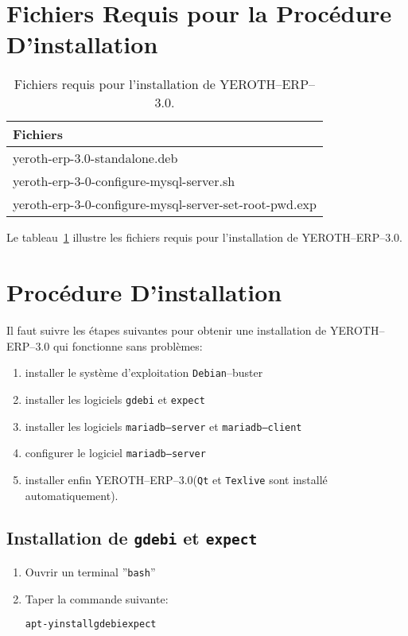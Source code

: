 \documentclass[a4paper, 10pt]{article}
\newcommand{\texlive}{\texttt{Texlive}\xspace}
\newcommand{\gdebi}{\texttt{gdebi}\xspace}
\newcommand{\expect}{\texttt{expect}\xspace}
\newcommand{\debian}{\texttt{Debian}\xspace}
\newcommand{\bash}{\texttt{bash}\xspace}
\newcommand{\qt}{\texttt{Qt}\xspace}
\newcommand{\mariadbserver}{\texttt{mariadb--server}\xspace}
\newcommand{\mariadbclient}{\texttt{mariadb--client}\xspace}
\newcommand{\yerotherptroiszero}{\textcolor{yerenColorBlue}{\sc YEROTH--ERP--$3.0$}\xspace}
\newcommand{\yerotherp}{\textcolor{yerenColorBlue}{\sc YEROTH--ERP--$3.0$}\xspace}
\newcommand{\rootcommand}[1]{
\begin{center}
\textcolor{purplish}{#1\xspace}
\end{center}}
\begin{document}
\section{Fichiers Requis pour la Proc\'edure D'installation}

\begin{table}[!htbp]
\centering
\begin{tabular}{|l|} \hline
\textbf{Fichiers}		\\ \hline
yeroth-erp-3.0-standalone.deb							\\ \hline
yeroth-erp-3-0-configure-mysql-server.sh				\\ \hline	
yeroth-erp-3-0-configure-mysql-server-set-root-pwd.exp	\\ \hline	
\end{tabular}
\caption{Fichiers requis pour l'installation de \yerotherptroiszero.}
\label{tab:required-files}
\end{table}

Le tableau~\ref{tab:required-files} illustre les fichiers
requis pour l'installation de \yerotherp.

\section{Proc\'edure D'installation}

Il faut suivre les \'etapes suivantes pour obtenir
une installation de \yerotherptroiszero qui fonctionne
sans probl\`emes:

\begin{enumerate} [1)]
	\item installer le syst\`eme d'exploitation \debian--buster
	\item installer les logiciels \gdebi et \expect
	\item installer les logiciels \mariadbserver et \mariadbclient
	\item configurer le logiciel \mariadbserver
	\item installer enfin \yerotherptroiszero (\qt et \texlive sont install\'e automatiquement).
\end{enumerate}

\subsection{Installation de \gdebi et \expect}

\begin{enumerate}[1)]
	\item Ouvrir un terminal ''\bash''
	\item Taper la commande suivante:
		\begin{alltt}
			\rootcommand{apt -y install gdebi expect}
		\end{alltt}
\end{enumerate} 
\end{document}
